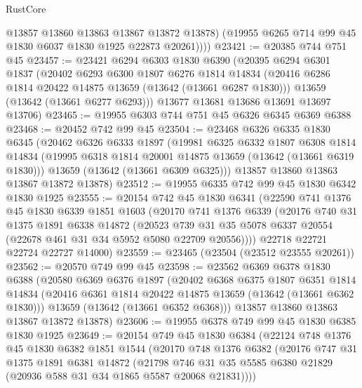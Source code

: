 \begin{lexlean}{RustCore}
\begin{coremodule}
            @13857
            @13860
            @13863
            @13867
            @13872
            @13878)
          (@19955 @6265 @714 @99 @45 @1830 @6037 @1830 @1925 @22873 @20261))))
@23421 := @20385 @744 @751 @45
@23457 := @23421
    @6294
    @6303
    @1830
    @6390
    (@20395
      @6294
      @6301
      @1837
      (@20402
        @6293
        @6300
        @1807
        @6276
        @1814
        @14834
        (@20416 @6286 @1814 @20422 @14875 @13659 (@13642 (@13661 @6287 @1830)))
        @13659
        (@13642 (@13661 @6277 @6293)))
      @13677
      @13681
      @13686
      @13691
      @13697
      @13706)
@23465 := @19955 @6303 @744 @751 @45 @6326 @6345 @6369 @6388
@23468 := @20452 @742 @99 @45
@23504 := @23468
    @6326
    @6335
    @1830
    @6345
    (@20462
      @6326
      @6333
      @1897
      (@19981
        @6325
        @6332
        @1807
        @6308
        @1814
        @14834
        (@19995 @6318 @1814 @20001 @14875 @13659 (@13642 (@13661 @6319 @1830)))
        @13659
        (@13642 (@13661 @6309 @6325)))
      @13857
      @13860
      @13863
      @13867
      @13872
      @13878)
@23512 := @19955 @6335 @742 @99 @45 @1830 @6342 @1830 @1925
@23555 := @20154
    @742
    @45
    @1830
    @6341
    (@22590
      @741
      @1376
      @45
      @1830
      @6339
      @1851
      @1603
      (@20170
        @741
        @1376
        @6339
        (@20176
          @740
          @31
          @1375
          @1891
          @6338
          @14872
          (@20523 @739 @31 @35 @5078 @6337 @20554 (@22678 @461 @31 @34 @5952 @5080 @22709 @20556))))
      @22718
      @22721
      @22724
      @22727
      @14000)
@23559 := @23465 (@23504 (@23512 @23555 @20261))
@23562 := @20570 @749 @99 @45
@23598 := @23562
    @6369
    @6378
    @1830
    @6388
    (@20580
      @6369
      @6376
      @1897
      (@20402
        @6368
        @6375
        @1807
        @6351
        @1814
        @14834
        (@20416 @6361 @1814 @20422 @14875 @13659 (@13642 (@13661 @6362 @1830)))
        @13659
        (@13642 (@13661 @6352 @6368)))
      @13857
      @13860
      @13863
      @13867
      @13872
      @13878)
@23606 := @19955 @6378 @749 @99 @45 @1830 @6385 @1830 @1925
@23649 := @20154
    @749
    @45
    @1830
    @6384
    (@22124
      @748
      @1376
      @45
      @1830
      @6382
      @1851
      @1544
      (@20170
        @748
        @1376
        @6382
        (@20176
          @747
          @31
          @1375
          @1891
          @6381
          @14872
          (@21798 @746 @31 @35 @5585 @6380 @21829 (@20936 @588 @31 @34 @1865 @5587 @20068 @21831))))

\end{coremodule}
\end{lexlean}
